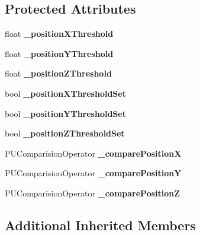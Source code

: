 \subsection*{Protected Attributes}
\begin{DoxyCompactItemize}
\item 
\mbox{\label{classPUOnPositionObserver_aa3a3ecc54af5959ad8c509c7247be60d}} 
float {\bfseries \+\_\+position\+X\+Threshold}
\item 
\mbox{\label{classPUOnPositionObserver_a92cd4e7616c30f7f8c53e1794ed9381e}} 
float {\bfseries \+\_\+position\+Y\+Threshold}
\item 
\mbox{\label{classPUOnPositionObserver_af44d0b59cb90d9967d2638a2905ba51a}} 
float {\bfseries \+\_\+position\+Z\+Threshold}
\item 
\mbox{\label{classPUOnPositionObserver_a5769282a4e906281e624285522c5fd0c}} 
bool {\bfseries \+\_\+position\+X\+Threshold\+Set}
\item 
\mbox{\label{classPUOnPositionObserver_acb33ce45db7d789f2943c4a612605181}} 
bool {\bfseries \+\_\+position\+Y\+Threshold\+Set}
\item 
\mbox{\label{classPUOnPositionObserver_a274c76f4c5e83e63b32bd9c1cafba574}} 
bool {\bfseries \+\_\+position\+Z\+Threshold\+Set}
\item 
\mbox{\label{classPUOnPositionObserver_ac3b032ef640c6ff4f86180331aea4ac9}} 
P\+U\+Comparision\+Operator {\bfseries \+\_\+compare\+PositionX}
\item 
\mbox{\label{classPUOnPositionObserver_a1c3635c15293472018ea1da2805db025}} 
P\+U\+Comparision\+Operator {\bfseries \+\_\+compare\+PositionY}
\item 
\mbox{\label{classPUOnPositionObserver_a265f61bd5167a7c811e17936673458e3}} 
P\+U\+Comparision\+Operator {\bfseries \+\_\+compare\+PositionZ}
\end{DoxyCompactItemize}
\subsection*{Additional Inherited Members}


